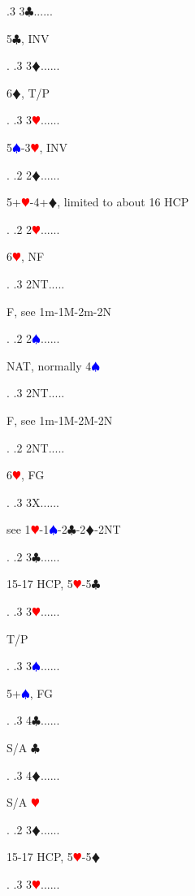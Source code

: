 \documentclass[a4paper]{article}
\newcommand{\BC}{\textcolor{OliveGreen}{$\clubsuit$}}
\newcommand{\BD}{\textcolor{RedOrange}{$\vardiamondsuit$}}
\newcommand{\BH}{\textcolor{Red}{$\varheartsuit${}}}
\newcommand{\BS}{\textcolor{Blue}{$\spadesuit${}}}
\begin{document}
{ .3 3\BC......\begin{minipage}[t]{0.8\textwidth}
5\BC , INV
\end{minipage}. 
 .3 3\BD......\begin{minipage}[t]{0.8\textwidth}
6\BD , T/P
\end{minipage}. 
 .3 3\BH......\begin{minipage}[t]{0.8\textwidth}
5\BS -3\BH , INV
\end{minipage}. 
 .2 2\BD......\begin{minipage}[t]{0.8\textwidth}
5+\BH -4+\BD , limited to about 16 HCP
\end{minipage}. 
 .2 2\BH......\begin{minipage}[t]{0.8\textwidth}
6\BH , NF
\end{minipage}. 
 .3 2NT.....\begin{minipage}[t]{0.8\textwidth}
F, see 1m-1M-2m-2N
\end{minipage}. 
 .2 2\BS......\begin{minipage}[t]{0.8\textwidth}
NAT, normally 4\BS 
\end{minipage}. 
 .3 2NT.....\begin{minipage}[t]{0.8\textwidth}
F, see 1m-1M-2M-2N
\end{minipage}. 
 .2 2NT.....\begin{minipage}[t]{0.8\textwidth}
6\BH , FG
\end{minipage}. 
 .3 3X......\begin{minipage}[t]{0.8\textwidth}
see 1\BH -1\BS -2\BC -2\BD -2NT
\end{minipage}. 
 .2 3\BC......\begin{minipage}[t]{0.8\textwidth}
15-17 HCP, 5\BH -5\BC 
\end{minipage}. 
 .3 3\BH......\begin{minipage}[t]{0.8\textwidth}
T/P
\end{minipage}. 
 .3 3\BS......\begin{minipage}[t]{0.8\textwidth}
5+\BS , FG
\end{minipage}. 
 .3 4\BC......\begin{minipage}[t]{0.8\textwidth}
S/A \BC 
\end{minipage}. 
 .3 4\BD......\begin{minipage}[t]{0.8\textwidth}
S/A \BH 
\end{minipage}. 
 .2 3\BD......\begin{minipage}[t]{0.8\textwidth}
15-17 HCP, 5\BH -5\BD 
\end{minipage}. 
 .3 3\BH......\begin{minipage}[t]{0.8\textwidth}

\end{minipage}}
\end{document}
